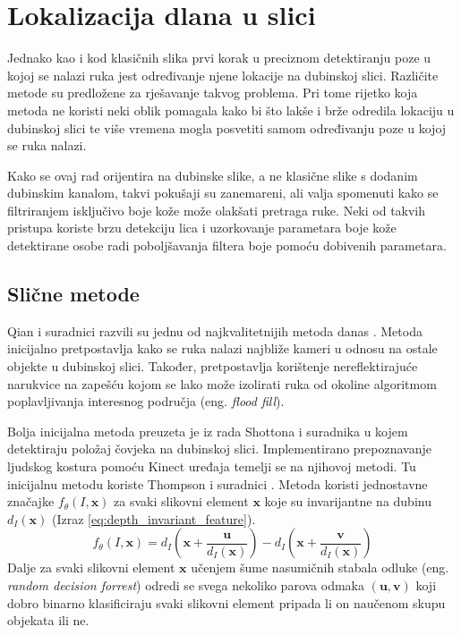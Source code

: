 \documentclass[times, utf8, diplomski, numeric]{fer}
\begin{document}
\section{Lokalizacija dlana u slici}
Jednako kao i kod klasičnih slika prvi korak u preciznom detektiranju poze u kojoj se nalazi ruka jest određivanje njene lokacije na dubinskoj slici. Različite metode su predložene za rješavanje takvog problema. Pri tome rijetko koja metoda ne koristi neki oblik pomagala kako bi što lakše i brže odredila lokaciju u dubinskoj slici te više vremena mogla posvetiti samom određivanju poze u kojoj se ruka nalazi.

Kako se ovaj rad orijentira na dubinske slike, a ne klasične slike s dodanim dubinskim kanalom, takvi pokušaji su zanemareni, ali valja spomenuti kako se filtriranjem isključivo boje kože može olakšati pretraga ruke. Neki od takvih pristupa koriste brzu detekciju lica i uzorkovanje parametara boje kože detektirane osobe radi poboljšavanja filtera boje pomoću dobivenih parametara.

\subsection{Slične metode}
Qian i suradnici razvili su jednu od najkvalitetnijih metoda danas \cite{qian2014realtime}. Metoda inicijalno pretpostavlja kako se ruka nalazi najbliže kameri u odnosu na ostale objekte u dubinskoj slici. Također, pretpostavlja korištenje nereflektirajuće narukvice na zapešću kojom se lako može izolirati ruka od okoline algoritmom poplavljivanja interesnog područja (eng. \textit{flood fill}).

Bolja inicijalna metoda preuzeta je iz rada Shottona i suradnika \cite{shotton2013real} u kojem detektiraju položaj čovjeka na dubinskoj slici. Implementirano prepoznavanje ljudskog kostura pomoću Kinect uređaja temelji se na njihovoj metodi. Tu inicijalnu metodu koriste Thompson i suradnici \cite{tompson2014real}. Metoda koristi jednostavne značajke $f_{\theta}(I,\mathbf{x})$ za svaki slikovni element $\mathbf{x}$ koje su invarijantne na dubinu $d_{I}(\mathbf{x}) $ (Izraz \ref{eq:depth_invariant_feature}).
\begin{equation}\label{eq:depth_invariant_feature}
f_{\theta}(I,\mathbf{x})=d_{I}(\mathbf{x}+ \frac{\mathbf{u}}{d_{I}(\mathbf{x})})-d_{I}(\mathbf{x}+ \frac{\mathbf{v}}{d_{I}(\mathbf{x})})\end{equation}
Dalje za svaki slikovni element $\mathbf{x}$ učenjem šume nasumičnih stabala odluke (eng. \textit{random decision forrest}) odredi se svega nekoliko parova odmaka $(\mathbf{u},\mathbf{v})$ koji dobro binarno klasificiraju svaki slikovni element pripada li on naučenom skupu objekata ili ne.
\end{document}
